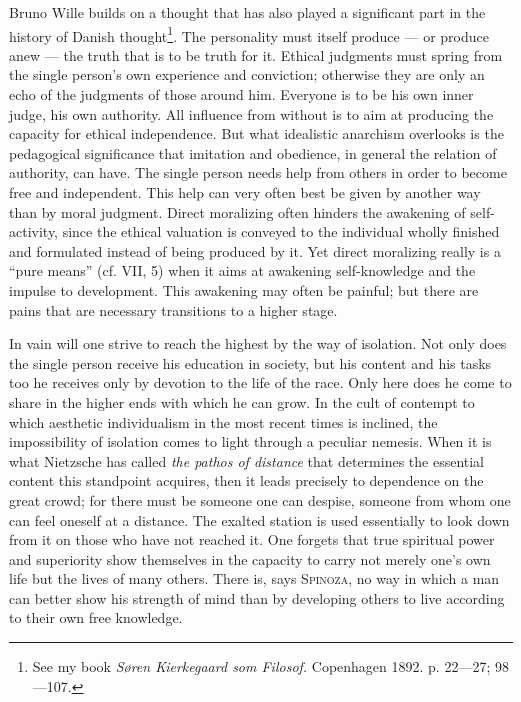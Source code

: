 \documentclass[12pt,a4paper,openany]{book}
\newcommand{\opage}[1]{\marginnote{\footnotesize\textit{[#1]}}}
\begin{document}
Bruno Wille builds on a thought that has also played a significant part in the history of Danish
thought\footnote[2]{See my book \textit{Søren Kierkegaard som Filosof.} Copenhagen 1892. p. 22---27;
98---107.}. The personality must itself produce --- or produce anew
\opage{165}--- the truth that is to be truth for it. Ethical judgments must spring from the single person's own
experience and conviction; otherwise they are only an echo of the judgments of those around him. Everyone is
to be his own inner judge, his own authority. All influence from without is to aim at producing the capacity
for ethical independence. But what idealistic anarchism overlooks is the pedagogical significance that
imitation and obedience, in general the relation of authority, can have. The single person needs help from
others in order to become free and independent. This help can very often best be given by another way than by
moral judgment. Direct moralizing often hinders the awakening of self-activity, since the ethical valuation is
conveyed to the individual wholly finished and formulated instead of being produced by it. Yet direct
moralizing really is a ``pure means'' (cf. VII, 5) when it aims at awakening self-knowledge and the impulse to
development. This awakening may often be painful; but there are pains that are necessary transitions to a
higher stage.

In vain will one strive to reach the highest by the way of isolation. Not only does the single person receive
his education in society, but his content and his tasks too he receives only by devotion to the life of the
race. Only here does he come to share in the higher ends with which he can grow. In the cult of contempt to
which aesthetic individualism in the most recent times is inclined, the impossibility of isolation comes to
light through a peculiar nemesis. When it is what Nietzsche has called \textit{the pathos of distance} that
determines the essential content this standpoint acquires, then it leads precisely to dependence on the great
crowd; for there must be someone one can despise, someone from whom one can feel oneself at a distance. The
exalted station is used essentially to look down from it on those who have not reached it. One forgets that
true spiritual power and superiority show themselves in the capacity to carry not merely one's own life but
the lives of many others. There is, says \textsc{Spinoza}, no way in which a man can better show his strength
of mind than by developing others to live according to their own free knowledge.
\end{document}
